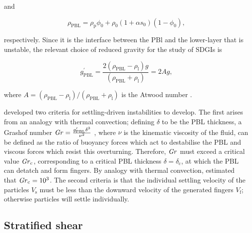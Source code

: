 \documentclass[authoryear,preprint,review,12pt]{elsarticle}
\newcommand\Gr{\mbox{\textit{Gr}}} %
\begin{document}
and

\begin{equation}
  \label{equ:PBL_dens}
  \rho_{\text{PBL}} = \rho_{\text{p}} \phi_{0} + \rho_{0} (1 + \alpha s_{0}) (1 - \phi_{0}),
\end{equation}

respectively. Since it is the interface between the PBl and the lower-layer that is unstable, the relevant choice of reduced gravity for the study of SDGIs is \citep{Davies_Wykes14}

\begin{equation}
  \label{equ:red_grav_PBL}
  g^{\prime}_{\text{PBL}} = \frac{2 (\rho_{\text{PBL}} - \rho_{\text{l}}) g}{(\rho_{\text{PBL}} + \rho_{\text{l}})} = 2 A g,
\end{equation}

where $A = (\rho_{\text{PBL}} - \rho_{\text{l}}) / (\rho_{\text{PBL}} + \rho_{\text{l}})$ is the Atwood number \citep{Sharp84}.

\citet{Hoyal99} developed two criteria for settling-driven instabilities to develop. The first arises from an analogy with thermal convection; defining $\delta$ to be the PBL thickness, a Grashof number $\Gr = \frac{g^{\prime}_{\text{PBL}} \delta^{3}}{\nu^{2}}$ \citep{Turner79}, where $\nu$ is the kinematic viscosity of the fluid, can be defined as the ratio of buoyancy forces which act to destabilise the PBL and viscous forces which resist this overturning. Therefore, $\Gr$ must exceed a critical value $\Gr_{\text{c}}$, corresponding to a critical PBL thickness $\delta = \delta_{\text{c}}$, at which the PBL can detatch and form fingers. By analogy with thermal convection, \citet{Hoyal99} estimated that $\Gr_{\text{c}} = 10^{3}$. The second criteria is that the individual settling velocity of the particles $V_{\text{s}}$ must be less than the downward velocity of the generated fingers $V_{\text{f}}$; otherwise particles will settle individually. 

\subsection{Stratified shear}
\label{subsec:strat_shear}
\end{document}
